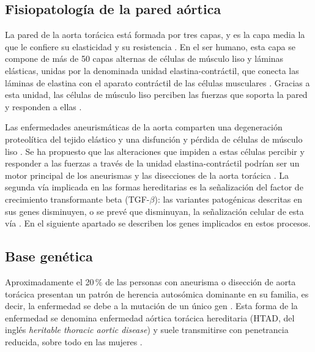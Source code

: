 \subsection{Fisiopatología de la pared aórtica}

La pared de la aorta torácica está formada por tres capas, y es la capa media la que le confiere su elasticidad y su resistencia \cite{Pinard2019}. En el ser humano, esta capa se compone de más de 50 capas alternas de células de músculo liso y láminas elásticas, unidas por la denominada unidad elastina-contráctil, que conecta las láminas de elastina con el aparato contráctil de las células musculares \cite{Pinard2019}. Gracias a esta unidad, las células de músculo liso perciben las fuerzas que soporta la pared y responden a ellas \cite{Pinard2019}.

Las enfermedades aneurismáticas de la aorta comparten una degeneración proteolítica del tejido elástico y una disfunción y pérdida de células de músculo liso \cite{Pinard2019}. Se ha propuesto que las alteraciones que impiden a estas células percibir y responder a las fuerzas a través de la unidad elastina-contráctil podrían ser un motor principal de los aneurismas y las disecciones de la aorta torácica \cite{Pinard2019}. La segunda vía implicada en las formas hereditarias es la señalización del factor de crecimiento transformante beta (TGF-$\beta$): las variantes patogénicas descritas en sus genes disminuyen, o se prevé que disminuyan, la señalización celular de esta vía \cite{Pinard2019}. En el siguiente apartado se describen los genes implicados en estos procesos.

\subsection{Base genética}

Aproximadamente el 20\,\% de las personas con aneurisma o disección de aorta torácica presentan un patrón de herencia autosómica dominante en su familia, es decir, la enfermedad se debe a la mutación de un único gen \cite{Pinard2019}. Esta forma de la enfermedad se denomina enfermedad aórtica torácica hereditaria (HTAD, del inglés \textit{heritable thoracic aortic disease}) y suele transmitirse con penetrancia reducida, sobre todo en las mujeres \cite{Pinard2019}.

